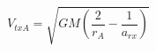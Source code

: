 \begin{equation*}
V_{txA} = \sqrt{GM \left(\frac{2}{r_{A}} - \frac{1}{a_{rx}} \right)} \tag{4.61}
\end{equation*}
